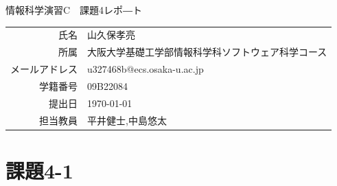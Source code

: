 \documentclass[dvipdfmx]{jarticle}
\begin{document}
\begin{titlepage}
    \begin{center}
        {\huge 情報科学演習C　課題4レポ―ト}
        \vspace{180pt}\\
        \begin{tabular}{rl}
            氏名 & 山久保孝亮\\
            所属 & 大阪大学基礎工学部情報科学科ソフトウェア科学コース\\
            メールアドレス & u327468b@ecs.osaka-u.ac.jp\\
            学籍番号 & 09B22084\\
            提出日 & \today\\
            担当教員 & 平井健士,中島悠太
        \end{tabular}
    \end{center}
\end{titlepage}
\section{課題4-1}
\end{document}

